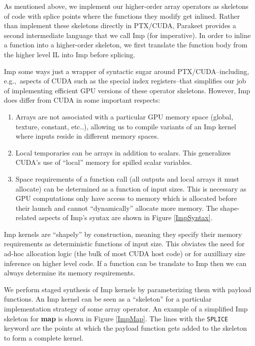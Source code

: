 \documentclass[preprint]{sigplanconf}
\begin{document}
As mentioned above, we implement our higher-order array operators as skeletons
of code with splice points where the functions they modify get inlined.  Rather
than implement these skeletons directly in PTX/CUDA, Parakeet
provides a second intermediate language that we call Imp (for imperative).  In
order to inline a function into a higher-order skeleton, we first translate the
function body from the higher level IL into Imp before splicing.

Imp some ways just a wrapper of syntactic sugar around
PTX/CUDA--including, e.g.,~aspects of CUDA such as the special index
registers--that simplifies our job of implementing efficient GPU versions of
these operator skeletons. However, Imp does differ from CUDA in some important
respects:

\begin{enumerate}
\item  Arrays are not associated with a particular GPU memory space (global,
texture, constant, etc..), allowing us to compile variants of an Imp kernel
where inputs reside in different memory spaces.

\item Local temporaries can be arrays in addition to scalars. This generalizes
CUDA's use of ``local'' memory for spilled scalar variables.

\item Space requirements of a function call (all outputs and local arrays it
must allocate) can be determined as a function of input sizes. This is necessary
as GPU computations only have access to memory which is allocated before their
launch and cannot ``dynamically'' allocate more memory.  The shape-related
aspects of Imp's syntax are shown in Figure \ref{ImpSyntax}.
\end{enumerate}
Imp kernels are ``shapely'' by construction, meaning they specify their memory
requirements as deterministic functions of input size. This obviates the
need for ad-hoc allocation logic (the bulk of most CUDA host code) or for
auxilliary size inference on higher level code. If a function can be translate
to Imp then we can always determine its memory requirements.

We perform staged synthesis of Imp kernels by parameterizing them with payload
functions. An Imp kernel can be seen as a ``skeleton'' \cite{Cole04} for a
particular implementation strategy of some array operator.  An example of a
simplified Imp skeleton for \textbf{map} is shown in Figure \ref{ImpMap}.  The
lines with the \texttt{SPLICE} keyword are the points at which the payload
function gets added to the skeleton to form a complete kernel.
\end{document}
